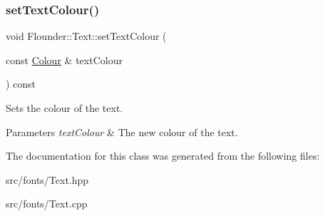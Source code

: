 \subsubsection{\texorpdfstring{set\+Text\+Colour()}{setTextColour()}}
{\footnotesize\ttfamily void Flounder\+::\+Text\+::set\+Text\+Colour (\begin{DoxyParamCaption}\item[{const \hyperlink{class_flounder_1_1_colour}{Colour} \&}]{text\+Colour }\end{DoxyParamCaption}) const\hspace{0.3cm}{\ttfamily [inline]}}



Sets the colour of the text. 


\begin{DoxyParams}{Parameters}
{\em text\+Colour} & The new colour of the text. \\
\hline
\end{DoxyParams}


The documentation for this class was generated from the following files\+:\begin{DoxyCompactItemize}
\item 
src/fonts/Text.\+hpp\item 
src/fonts/Text.\+cpp\end{DoxyCompactItemize}
